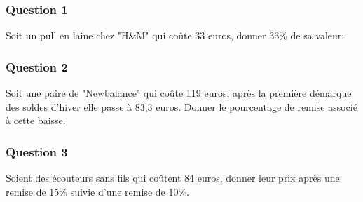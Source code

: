 \documentclass[t,12pt]{beamer}
\begin{document}
\begin{frame}
	\frametitle{Question 1}
Soit un pull en laine chez "H\&M" qui coûte $33$ euros, donner 33\% de sa valeur: 
\end{frame}

\begin{frame}
\frametitle{Question 2}
Soit une paire de "Newbalance" qui coûte 119 euros, après la première démarque des soldes d'hiver elle passe à 83,3 euros. Donner le pourcentage de remise associé à cette baisse. 

\end{frame}


\begin{frame}
\frametitle{Question 3}
Soient des écouteurs sans fils qui coûtent 84 euros, donner leur prix après une remise de 15\% suivie d'une remise de 10\%.  
\end{frame}
\end{document}
